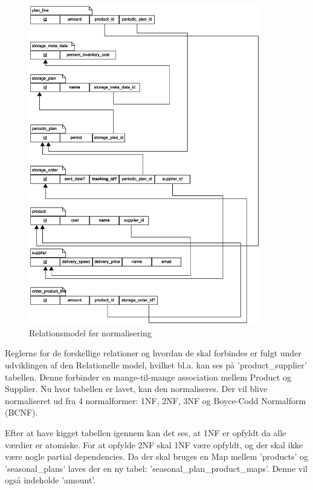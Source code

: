 \begin{figure}[H]
    \centering
    \includegraphics[width=0.9\textwidth]{figures/krav/relation_model_0th_normalization.eps}
    \caption{Relationsmodel før normalisering}
    \label{fig:relational_model_0}
\end{figure}

Reglerne for de forskellige relationer og hvordan de skal forbindes er fulgt under udviklingen af den Relationelle model, hvilket bl.a. kan ses på 'product\_supplier' tabellen. Denne forbinder en mange-til-mange association mellem Product og Supplier. 
Nu hvor tabellen er lavet, kan den normaliseres. Der vil blive normaliseret ud fra 4 normalformer: 1NF, 2NF, 3NF og Boyce-Codd Normalform (BCNF)\cite{DatabaseSystems}.

Efter at have kigget tabellen igennem kan det ses, at 1NF er opfyldt da alle værdier er atomiske.
For at opfylde 2NF skal 1NF være opfyldt, og der skal ikke være nogle partial dependencies. Da der skal bruges en Map mellem 'products' og 'seasonal\_plans' laves der en ny tabel: 'seasonal\_plan\_product\_maps'. Denne vil også indeholde 'amount'.

